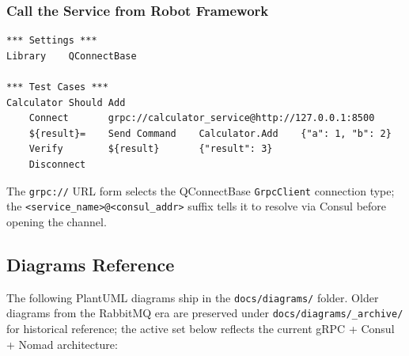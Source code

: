 \subsubsection{Call the Service from Robot Framework}

\begin{verbatim}
*** Settings ***
Library    QConnectBase

*** Test Cases ***
Calculator Should Add
    Connect       grpc://calculator_service@http://127.0.0.1:8500
    ${result}=    Send Command    Calculator.Add    {"a": 1, "b": 2}
    Verify        ${result}       {"result": 3}
    Disconnect
\end{verbatim}

\noindent
The \texttt{grpc://} URL form selects the QConnectBase \texttt{GrpcClient}
connection type; the \texttt{<service\_name>@<consul\_addr>} suffix tells it
to resolve via Consul before opening the channel.

\subsection{Diagrams Reference}

The following PlantUML diagrams ship in the \texttt{docs/diagrams/} folder.  Older
diagrams from the RabbitMQ era are preserved under
\texttt{docs/diagrams/\_archive/} for historical reference; the active set below
reflects the current gRPC + Consul + Nomad architecture:

